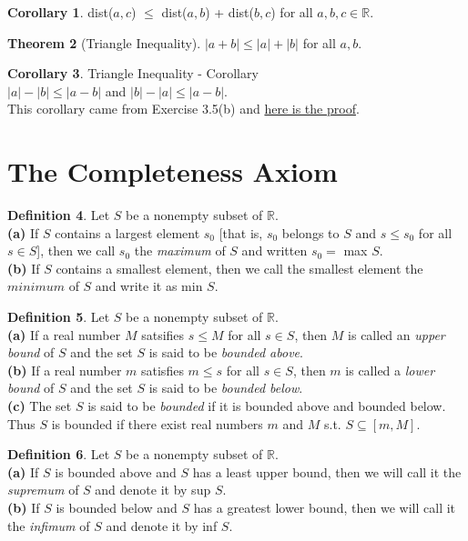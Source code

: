 \documentclass{book}
\theoremstyle{definition}
\newtheorem{definition}{Definition}[section]
\newtheorem{theorem}[definition]{Theorem}
\newtheorem{corollary}[definition]{Corollary}
\begin{document}
\begin{corollary}
dist($a,c$) $\leq$ dist($a,b$) + dist($b,c$) for all $a,b,c \in \mathbb{R}$.
\end{corollary}
\begin{theorem}[Triangle Inequality]
$|a+b| \leq |a| + |b|$ for all $a,b$.
\end{theorem}
\begin{corollary}Triangle Inequality - Corollary
\\ $|a|-|b| \leq |a-b|$ and $|b|-|a| \leq |a-b|$.
\\ This corollary came from Exercise 3.5(b) and  \href{http://math.stackexchange.com/questions/1960593/double-absolute-value-proof-a-b-le-a-b}{here is the proof}.
\end{corollary}
\section{The Completeness Axiom}
\begin{definition}
Let $S$ be a nonempty subset of $\mathbb{R}$.
\\ \textbf{(a)} If $S$ contains a largest element $s_0$ [that is, $s_0$ belongs to $S$ and $s \leq s_0$ for all $s \in S$], then we call $s_0$ the \textit{maximum} of $S$ and written $s_0 = $ max $S$.
\\ \textbf{(b)} If $S$ contains a smallest element, then we call the smallest element the $minimum$ of $S$ and write it as min $S$.
\end{definition}
\begin{definition}
Let $S$ be a nonempty subset of $\mathbb{R}$.
\\ \textbf{(a)} If a real number $M$ satsifies $s \leq M$ for all $s \in S$, then $M$ is called an \textit{upper bound} of $S$ and the set $S$ is said to be \textit{bounded above}.
\\ \textbf{(b)} If a real number $m$ satisfies $m \leq s$ for all $s \in S$, then $m$ is called a \textit{lower bound} of $S$ and the set $S$ is said to be \textit{bounded below}.
\\ \textbf{(c)} The set $S$ is said to be \textit{bounded} if it is bounded above and bounded below. Thus $S$ is bounded if there exist real numbers $m$ and $M$ s.t. $S \subseteq [m, M]$.
\end{definition}
\begin{definition}
Let $S$ be a nonempty subset of $\mathbb{R}$.
\\ \textbf{(a)} If $S$ is bounded above and $S$ has a least upper bound, then we will call it the \textit{supremum} of $S$ and denote it by sup $S$.
\\ \textbf{(b)} If $S$ is bounded below and $S$ has a greatest lower bound, then we will call it the \textit{infimum} of $S$ and denote it by inf $S$.
\end{definition}
\end{document}
